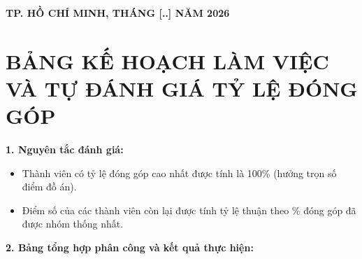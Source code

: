 \documentclass[12pt,a4paper]{article}
\begin{document}
\begin{titlepage}
    \vspace{1.0cm}
    \begin{center}
        \textbf{TP. HỒ CHÍ MINH, THÁNG [..] NĂM 2026}
    \end{center}
\end{titlepage}

\newpage
{}
\setcounter{page}{1}

\section*{BẢNG KẾ HOẠCH LÀM VIỆC VÀ TỰ ĐÁNH GIÁ TỶ LỆ ĐÓNG GÓP}

\noindent\textbf{1. Nguyên tắc đánh giá:}
\begin{itemize}
    \item Thành viên có tỷ lệ đóng góp cao nhất được tính là 100\% (hưởng trọn số điểm đồ án).
    \item Điểm số của các thành viên còn lại được tính tỷ lệ thuận theo \% đóng góp đã được nhóm thống nhất.
\end{itemize}

\vspace{0.3cm}

\noindent\textbf{2. Bảng tổng hợp phân công và kết quả thực hiện:}
\end{document}
